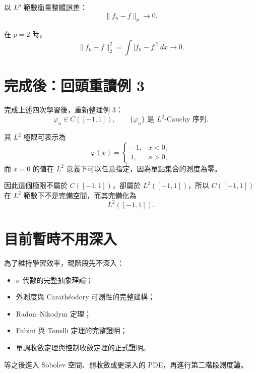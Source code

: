 \documentclass[11pt,a4paper,twoside]{article}
\newif\ifstudynotes
\newcommand{\ImportantNote}[2]{%
  \ifstudynotes
    \begin{importantNote}[title={#1}]
      #2
    \end{importantNote}
  \fi
}
\begin{document}
以 $L^p$ 範數衡量整體誤差：
\[
    \|f_n-f\|_p\to0.
\]

在 $p=2$ 時，
\[
    \|f_n-f\|_2^2
    =
    \int |f_n-f|^2\,dx
    \to0.
\]

\ImportantNote{最容易混淆的地方}{
    $L^2$ 收斂並不等於「每一點都逐點收斂」。

    例 3 的核心正是在比較「函數序列屬於 $C([-1,1])$」與
    「其 $L^2$ 極限是否仍屬於 $C([-1,1])$」。
}

\section*{完成後：回頭重讀例 3}

完成上述四次學習後，重新整理例 3：
\[
    \varphi_n\in C([-1,1]),
    \qquad
    \{\varphi_n\}\text{ 是 }L^2\text{-Cauchy 序列}.
\]

其 $L^2$ 極限可表示為
\[
    \varphi(x)=
    \begin{cases}
        -1, & x<0, \\
        1,  & x>0,
    \end{cases}
\]
而 $x=0$ 的值在 $L^2$ 意義下可以任意指定，因為單點集合的測度為零。

因此這個極限不屬於 $C([-1,1])$，卻屬於 $L^2([-1,1])$，所以
$C([-1,1])$ 在 $L^2$ 範數下不是完備空間，而其完備化為
\[
    L^2([-1,1]).
\]

\section*{目前暫時不用深入}

為了維持學習效率，現階段先不深入：

\begin{itemize}
    \item $\sigma$-代數的完整抽象理論；
    \item 外測度與 Carath\'eodory 可測性的完整建構；
    \item Radon--Nikodym 定理；
    \item Fubini 與 Tonelli 定理的完整證明；
    \item 單調收斂定理與控制收斂定理的正式證明。
\end{itemize}

等之後進入 Sobolev 空間、弱收斂或更深入的 PDE，再進行第二階段測度論。
\end{document}
